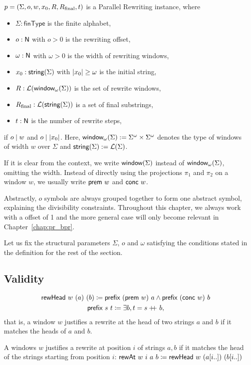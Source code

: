 \begin{definition}\label{def:pr}
  $p = (\Sigma, o, w, x_0, R, R_{\text{final}}, t)$ is a Parallel Rewriting instance, where 
  \begin{itemize}
    \item $\Sigma : \textsf{finType}$ is the finite alphabet,
    \item $o : \mathsf{N}$ with $o > 0$ is the rewriting offset,
    \item $\omega : \mathsf{N}$ with $\omega > 0$ is the width of rewriting windows,
    \item $x_0 : \textsf{string}{(\Sigma)}$ with $|x_0| \ge \omega$ is the initial string, 
    \item $R : \mathcal{L} (\textsf{window}_{\omega}{(\Sigma)})$ is the set of rewrite windows,
    \item $R_{\text{final}} : \mathcal{L} (\textsf{string}{(\Sigma)})$ is a set of final substrings,
    \item $t : \mathsf{N}$ is the number of rewrite steps, 
  \end{itemize}
  if $o \mid w$ and $o \mid |x_0|$. 
Here, $\textsf{window}_{\omega}{(\Sigma)} := {\Sigma}^\omega \times {\Sigma}^\omega$ denotes the type of windows of width $w$ over $\Sigma$ and $\textsf{string}{(\Sigma)} := \mathcal{L} (\Sigma)$. 
\end{definition}
If it is clear from the context, we write $\textsf{window}{(\Sigma)}$ instead of $\textsf{window}_{\omega}{(\Sigma)}$, omitting the width.
Instead of directly using the projections $\pi_1$ and $\pi_2$ on a window $w$, we usually write $\textsf{prem}~w$ and $\textsf{conc}~w$. 

Abstractly, $o$ symbols are always grouped together to form one abstract symbol, explaining the divisibility constraints. Throughout this chapter, we always work with a offset of 1 and the more general case will only become relevant in Chapter~\ref{chap:pr_bpr}.

Let us fix the structural parameters $\Sigma$, $o$ and $\omega$ satisfying the conditions stated in the definition for the rest of the section.

\subsection{Validity}

\begin{definition}
  \begin{gather*}
    \textsf{rewHead}~w~(a)~(b) \coloneqq \textsf{prefix}~(\textsf{prem}~w)~a \land \textsf{prefix}~(\textsf{conc}~w)~b \\
    \textsf{prefix}~s~t \coloneqq \exists b, t = s +\kern-1.3ex+\kern0.8ex{} b,
  \end{gather*}
  that is, a window $w$ justifies a rewrite at the head of two strings $a$ and $b$ if it matches the heads of $a$ and $b$.

  A windows $w$ justifies a rewrite at position $i$ of strings $a, b$ if it matches the head of the strings starting from position $i$:
    $\textsf{rewAt}~w~i~a~b \coloneqq \textsf{rewHead}~w~(a[i..])~(b[i..])$
\end{definition}

